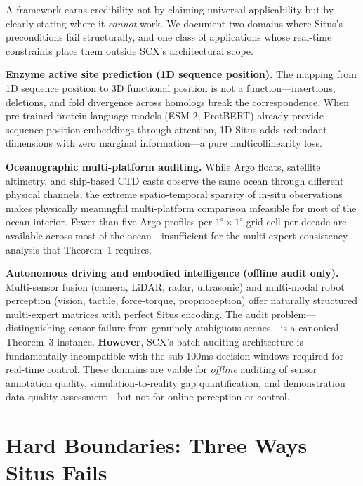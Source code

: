 \documentclass[12pt,a4paper]{article}
\begin{document}
A framework earns credibility not by claiming universal applicability but by clearly stating where it \emph{cannot} work. We document two domains where Situs's preconditions fail structurally, and one class of applications whose real-time constraints place them outside SCX's architectural scope.

\textbf{Enzyme active site prediction (1D sequence position).} The mapping from 1D sequence position to 3D functional position is not a function---insertions, deletions, and fold divergence across homologs break the correspondence. When pre-trained protein language models (ESM-2, ProtBERT) already provide sequence-position embeddings through attention, 1D Situs adds redundant dimensions with zero marginal information---a pure multicollinearity loss.

\textbf{Oceanographic multi-platform auditing.} While Argo floats, satellite altimetry, and ship-based CTD casts observe the same ocean through different physical channels, the extreme spatio-temporal sparsity of in-situ observations makes physically meaningful multi-platform comparison infeasible for most of the ocean interior. Fewer than five Argo profiles per $1^\circ \times 1^\circ$ grid cell per decade are available across most of the ocean---insufficient for the multi-expert consistency analysis that Theorem~1 requires.

\textbf{Autonomous driving and embodied intelligence (offline audit only).} Multi-sensor fusion (camera, LiDAR, radar, ultrasonic) and multi-modal robot perception (vision, tactile, force-torque, proprioception) offer naturally structured multi-expert matrices with perfect Situs encoding. The audit problem---distinguishing sensor failure from genuinely ambiguous scenes---is a canonical Theorem~3 instance. \textbf{However}, SCX's batch auditing architecture is fundamentally incompatible with the sub-100ms decision windows required for real-time control. These domains are viable for \emph{offline} auditing of sensor annotation quality, simulation-to-reality gap quantification, and demonstration data quality assessment---but not for online perception or control.

\section{Hard Boundaries: Three Ways Situs Fails}
\label{sec:hard}
\end{document}
